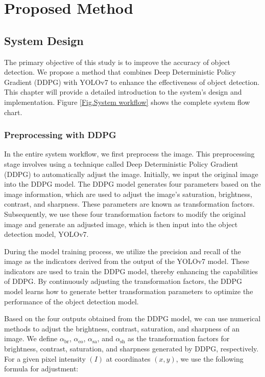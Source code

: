 \documentclass{PHlab-thesis}
\begin{document}
\chapter{Proposed Method}
\section{System Design}
The primary objective of this study is to improve the accuracy of object detection. We propose a method that combines Deep Deterministic Policy Gradient (DDPG) with YOLOv7 to enhance the effectiveness of object detection. This chapter will provide a detailed introduction to the system's design and implementation. Figure \ref{Fig.System workflow} shows the complete system flow chart.

\subsection{Preprocessing with DDPG}
In the entire system workflow, we first preprocess the image. This preprocessing stage involves using a technique called Deep Deterministic Policy Gradient (DDPG) to automatically adjust the image. Initially, we input the original image into the DDPG model. The DDPG model generates four parameters based on the image information, which are used to adjust the image's saturation, brightness, contrast, and sharpness. These parameters are known as transformation factors. Subsequently, we use these four transformation factors to modify the original image and generate an adjusted image, which is then input into the object detection model, YOLOv7.

During the model training process, we utilize the precision and recall of the image as the indicators derived from the output of the YOLOv7 model. These indicators are used to train the DDPG model, thereby enhancing the capabilities of DDPG. By continuously adjusting the transformation factors, the DDPG model learns how to generate better transformation parameters to optimize the performance of the object detection model.

Based on the four outputs obtained from the DDPG model, we can use numerical methods to adjust the brightness, contrast, saturation, and sharpness of an image. We define $\alpha_{\text{br}}$, $\alpha_{\text{co}}$, $\alpha_{\text{sa}}$, and $\alpha_{\text{sh}}$ as the transformation factors for brightness, contrast, saturation, and sharpness generated by DDPG, respectively. For a given pixel intensity $(I)$ at coordinates $(x,y)$, we use the following formula for adjustment:
\end{document}

